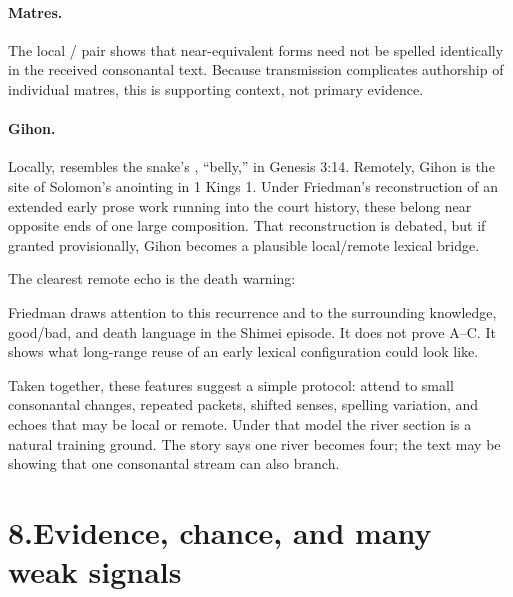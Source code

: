 \paragraph{Matres.}
The local / pair shows that near-equivalent forms need not be spelled identically in the received consonantal text. Because transmission complicates authorship of individual matres, this is supporting context, not primary evidence.

\paragraph{Gihon.}
Locally,  resembles the snake's , ``belly,'' in Genesis 3:14. Remotely, Gihon is the site of Solomon's anointing in 1 Kings 1. Under Friedman's reconstruction of an extended early prose work running into the court history, these belong near opposite ends of one large composition.\cite{Friedman1998} That reconstruction is debated, but if granted provisionally, Gihon becomes a plausible local/remote lexical bridge.

The clearest remote echo is the death warning:


Friedman draws attention to this recurrence and to the surrounding knowledge, good/bad, and death language in the Shimei episode.\cite{Friedman1998} It does not prove A--C. It shows what long-range reuse of an early lexical configuration could look like.

Taken together, these features suggest a simple protocol: attend to small consonantal changes, repeated packets, shifted senses, spelling variation, and echoes that may be local or remote. Under that model the river section is a natural training ground. The story says one river becomes four; the text may be showing that one consonantal stream can also branch.

\section*{8.\quad Evidence, chance, and many weak signals}

